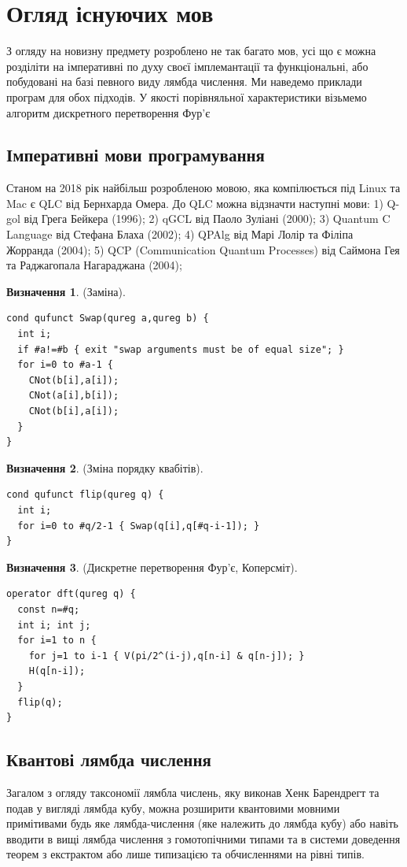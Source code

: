 \documentclass{article}
\theoremstyle{definition}
\newtheorem{definition}{Визначення}
\begin{document}
\section{Огляд існуючих мов}
З огляду на новизну предмету розроблено не так багато мов, усі що є можна розділіти
на імперативні по духу своєї імплемантації та функціональні, або побудовані на базі певного виду
лямбда числення. Ми наведемо приклади програм для обох підходів.
У якості порівняльної характеристики візьмемо алгоритм дискретного перетворення Фур'є

\subsection{Імперативні мови програмування}
Станом на 2018 рік найбільш розробленою мовою, яка компілюється під Linux та Mac
є QLC від Бернхарда Омера. До QLC можна відзначти наступні мови:
1) Q-gol від Грега Бейкера (1996);
2) qGCL від Паоло Зуліані (2000);
3) Quantum C Language від Стефана Блаха (2002);
4) QPAlg від Марі Лолір та Філіпа Жорранда (2004);
5) QCP (Communication Quantum Processes) від Саймона Гея та Раджагопала Нагараджана (2004);

\begin{definition} (Заміна).
\begin{lstlisting}
cond qufunct Swap(qureg a,qureg b) {
  int i;
  if #a!=#b { exit "swap arguments must be of equal size"; }
  for i=0 to #a-1 {
    CNot(b[i],a[i]);
    CNot(a[i],b[i]);
    CNot(b[i],a[i]);
  }
}
\end{lstlisting}
\end{definition}

\begin{definition} (Зміна порядку квабітів).
\begin{lstlisting}
cond qufunct flip(qureg q) {
  int i;
  for i=0 to #q/2-1 { Swap(q[i],q[#q-i-1]); }
}
\end{lstlisting}
\end{definition}

\begin{definition} (Дискретне перетворення Фур'є, Коперсміт).
\begin{lstlisting}
operator dft(qureg q) {
  const n=#q;
  int i; int j;
  for i=1 to n {
    for j=1 to i-1 { V(pi/2^(i-j),q[n-i] & q[n-j]); }
    H(q[n-i]);
  }
  flip(q);
}
\end{lstlisting}
\end{definition}

\subsection{Квантові лямбда числення}
Загалом з огляду таксономії лямбла числень, яку виконав Хенк Барендрегт та подав
у вигляді лямбда кубу, можна розширити квантовими мовними примітивами будь яке
лямбда-числення (яке належить до лямбда кубу) або навіть вводити в
вищі лямбда числення з гомотопічними типами та
в системи доведення теорем з екстрактом або лише типизацією та обчисленнями на рівні типів.
\end{document}
